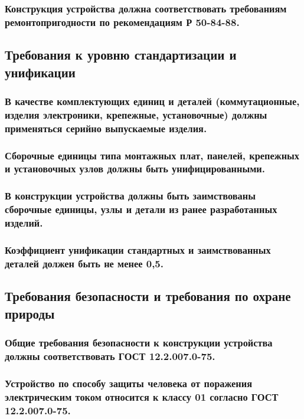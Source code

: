 \documentclass[a4paper]{bsuir-tor}
\begin{document}
 \subsubsection{ Конструкция устройства должна соответствовать
   требованиям ремонтопригодности по рекомендациям Р 50-84-88.}

 \subsection{Требования к уровню стандартизации и унификации}

 \subsubsection{В качестве комплектующих единиц и деталей
   (коммутационные, изделия электроники, крепежные, установочные)
   должны применяться серийно выпускаемые изделия.}

 \subsubsection{Сборочные единицы типа монтажных плат,
   панелей, крепежных и установочных узлов должны быть унифицированными.}

 \subsubsection{В конструкции устройства должны быть заимствованы
   сборочные единицы, узлы и детали из ранее разработанных изделий.}

 \subsubsection{ Коэффициент унификации стандартных и заимствованных
   деталей должен быть не менее 0,5.}

 \subsection{Требования безопасности и
   требования по охране природы}

 \subsubsection{Общие требования безопасности к конструкции устройства
   должны соответствовать ГОСТ 12.2.007.0-75.}

 \subsubsection{Устройство по способу защиты человека от поражения
   электрическим током относится к классу 01 согласно ГОСТ 12.2.007.0-75.}
\end{document}
